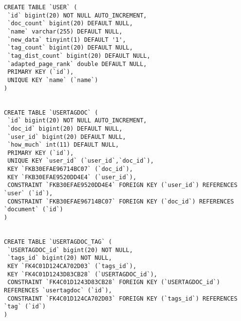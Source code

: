 \begin{lstlisting}[frame=lines, caption={Skrypt tworzący tabele w bazie danych}, label={sql_all}]
CREATE TABLE `USER` (
 `id` bigint(20) NOT NULL AUTO_INCREMENT,
 `doc_count` bigint(20) DEFAULT NULL,
 `name` varchar(255) DEFAULT NULL,
 `new_data` tinyint(1) DEFAULT '1',
 `tag_count` bigint(20) DEFAULT NULL,
 `tag_dist_count` bigint(20) DEFAULT NULL,
 `adapted_page_rank` double DEFAULT NULL,
 PRIMARY KEY (`id`),
 UNIQUE KEY `name` (`name`)
)


CREATE TABLE `USERTAGDOC` (
 `id` bigint(20) NOT NULL AUTO_INCREMENT,
 `doc_id` bigint(20) DEFAULT NULL,
 `user_id` bigint(20) DEFAULT NULL,
 `how_much` int(11) DEFAULT NULL,
 PRIMARY KEY (`id`),
 UNIQUE KEY `user_id` (`user_id`,`doc_id`),
 KEY `FKB30EFAE96714BC07` (`doc_id`),
 KEY `FKB30EFAE9520DD4E4` (`user_id`),
 CONSTRAINT `FKB30EFAE9520DD4E4` FOREIGN KEY (`user_id`) REFERENCES
`user` (`id`),
 CONSTRAINT `FKB30EFAE96714BC07` FOREIGN KEY (`doc_id`) REFERENCES
`document` (`id`)
) 


CREATE TABLE `USERTAGDOC_TAG` (
 `USERTAGDOC_id` bigint(20) NOT NULL,
 `tags_id` bigint(20) NOT NULL,
 KEY `FK4C01D124CA702D03` (`tags_id`),
 KEY `FK4C01D1243D83CB28` (`USERTAGDOC_id`),
 CONSTRAINT `FK4C01D1243D83CB28` FOREIGN KEY (`USERTAGDOC_id`)
REFERENCES `usertagdoc` (`id`),
 CONSTRAINT `FK4C01D124CA702D03` FOREIGN KEY (`tags_id`) REFERENCES
`tag` (`id`)
) 

\end{lstlisting}

